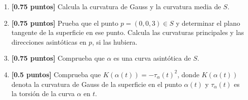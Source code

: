 \documentclass[12pt]{article}
\begin{document}
\begin{ejercicio}
\begin{enumerate}[label=\alph*)]
                Lo haremos a partir de la parametrización $X$, por lo que debemos calcular $E,G,F,e,g,f$. Para ello:
                \begin{gather*}
                    X_u = (-v\sen(u), v\cos(u), 2u), \qquad X_v = (\cos(u),\sen(u),-2) \\
                    X_{uu} = (-v\cos(u), -v\sen(u), 2), \quad X_{uv} = (-\sen(u),\cos(u),0), \quad X_{vv} = (0,0,0)
                \end{gather*}
                Así:
                \begin{align*}
                    E &= |X_u|^2 = v^2 + 4u^2, \qquad G = |X_v|^2 = 1+4 = 5 \\
                    F &= \langle X_u,X_v \rangle = -4u
                \end{align*}
                de donde:
                \begin{equation*}
                    EG -F^2 = 5v^2 + 20u^2 -16u^2 = 5v^2 + 4u^2
                \end{equation*}
                seguimos calculando:
                \begin{align*}
                    e &= \frac{\left|\begin{array}{ccc}
                        -v\sen(u) & v\cos(u) & 2u \\
                        \cos(u) & \sen(u) & -2 \\
                        -v\cos(u) & -v\sen(u) & 2
                    \end{array}\right|}{\sqrt{EG-F^2}}
                \end{align*}
            \item \textbf{[0.75 puntos]} Calcula la curvatura de Gauss y la curvatura media de $S$.
            \item \textbf{[0.75 puntos]} Prueba que el punto $p=(0,0,3)\in S$ y determinar el plano tangente de la superficie en ese punto. Calcula las curvaturas principales y las direcciones asintóticas en $p$, si las hubiera.
            \item \textbf{[0.75 puntos]} Comprueba que $\alpha$ es una curva asintótica de $S$.
            \item \textbf{[0.5 puntos]} Comprueba que $K(\alpha(t)) = -\tau_\alpha(t)^2$, donde $K(\alpha(t))$ denota la curvatura de Gauss de la superficie en el punto $\alpha(t)$ y $\tau_\alpha(t)$ es la torsión de la curva $\alpha$ en $t$.
        \end{enumerate}
    \end{ejercicio}
\end{document}
